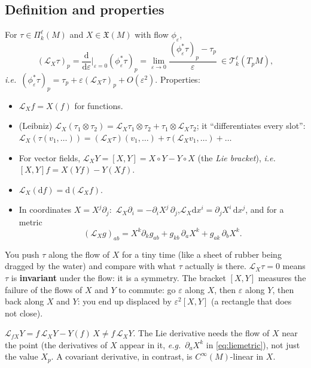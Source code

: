 \documentclass[11pt,a4paper]{article}
\numberwithin{equation}{section}
\theoremstyle{definition}
\theoremstyle{plain}
\newcommand{\dd}{\mathrm{d}}
\newcommand{\Lie}{\mathcal{L}}
\newcommand{\Xfield}{\mathfrak{X}}
\newcommand{\TT}[2]{\mathcal{T}^{#1}_{#2}}          %
\newcommand{\TF}[2]{\Pi^{#1}_{#2}}                  %
\newcommand{\ie}{\emph{i.e.}\ }
\newcommand{\eg}{\emph{e.g.}\ }
\begin{document}
\subsection{Definition and properties}
\begin{formal}
For $\tau\in\TF{\ell}{k}(M)$ and $X\in\Xfield(M)$ with flow $\phi_\varepsilon$,
\[
(\Lie_X\tau)_p=\frac{\dd}{\dd\varepsilon}\Big|_{\varepsilon=0}(\phi_\varepsilon^*\tau)_p=\lim_{\varepsilon\to0}\frac{(\phi_\varepsilon^*\tau)_p-\tau_p}{\varepsilon}\ \in\TT{\ell}{k}(T_pM),
\]
\ie $(\phi_\varepsilon^*\tau)_p=\tau_p+\varepsilon(\Lie_X\tau)_p+O(\varepsilon^2)$. Properties:
\begin{itemize}[nosep]
\item $\Lie_Xf=X(f)$ for functions.
\item (Leibniz) $\Lie_X(\tau_1\otimes\tau_2)=\Lie_X\tau_1\otimes\tau_2+\tau_1\otimes\Lie_X\tau_2$; it ``differentiates every slot'': $\Lie_X(\tau(v_1,\dots))=(\Lie_X\tau)(v_1,\dots)+\tau(\Lie_Xv_1,\dots)+\dots$
\item For vector fields, $\Lie_XY=[X,Y]=X\circ Y-Y\circ X$ (the \emph{Lie bracket}), \ie $[X,Y]f=X(Yf)-Y(Xf)$.
\item $\Lie_X(\dd f)=\dd(\Lie_Xf)$.
\item In coordinates $X=X^j\partial_j$:\ $\Lie_X\partial_i=-\partial_iX^j\,\partial_j$,\quad $\Lie_X\dd x^i=\partial_jX^i\,\dd x^j$, and for a metric
\begin{equation}\label{eq:liemetric}
(\Lie_Xg)_{ab}=X^k\partial_kg_{ab}+g_{kb}\,\partial_aX^k+g_{ak}\,\partial_bX^k .
\end{equation}
\end{itemize}
\end{formal}

\begin{intuition}
You push $\tau$ along the flow of $X$ for a tiny time (like a sheet of rubber being dragged by the water) and compare with what $\tau$ actually is there. $\Lie_X\tau=0$ means $\tau$ is \textbf{invariant} under the flow: it is a symmetry. The bracket $[X,Y]$ measures the failure of the flows of $X$ and $Y$ to commute: go $\varepsilon$ along $X$, then $\varepsilon$ along $Y$, then back along $X$ and $Y$: you end up displaced by $\varepsilon^2[X,Y]$ (a rectangle that does not close).
\end{intuition}

\begin{pitfall}[{$\Lie_X$ is \emph{not} a connection}]
$\Lie_{fX}Y=f\,\Lie_XY-Y(f)\,X\neq f\,\Lie_XY$. The Lie derivative needs the flow of $X$ near the point (the derivatives of $X$ appear in it, \eg $\partial_aX^k$ in \eqref{eq:liemetric}), not just the value $X_p$. A covariant derivative, in contrast, is $C^\infty(M)$-linear in $X$.
\end{pitfall}
\end{document}
